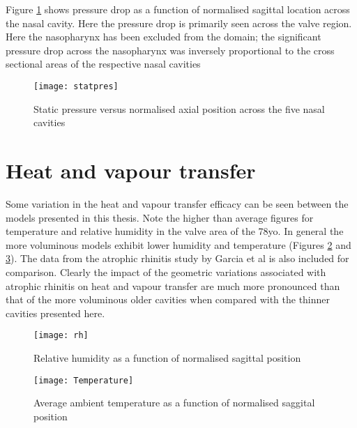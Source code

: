 Figure \ref{fig:stpr} shows pressure drop as a function of normalised sagittal location across the nasal cavity. Here the pressure drop is primarily seen across the valve region. Here the nasopharynx has been excluded from the domain; the significant pressure drop across the nasopharynx was inversely proportional to the cross sectional areas of the respective nasal cavities


\begin{figure} 
  \texttt{[image: statpres]}
  \caption{Static pressure versus normalised axial position across the five nasal cavities}
  \label{fig:stpr}
\end{figure}



\section{Heat and vapour transfer}

Some variation in the heat and vapour transfer efficacy can be seen between the models presented in this thesis. Note the higher than average figures for temperature and relative humidity in the valve area of the 78yo. In general the more voluminous models exhibit lower humidity and temperature (Figures \ref{fig:h2o} and \ref{fig:Temp}). The data from the atrophic rhinitis study by Garcia et al \cite{Garcia2007} is also included for comparison. Clearly the impact of the geometric variations associated with atrophic rhinitis on heat and vapour transfer are much more pronounced than that of the more voluminous older cavities when compared with the thinner cavities presented here. 

\begin{figure} 
  \texttt{[image: rh]}
  \caption{Relative humidity as a function of normalised sagittal position}
  \label{fig:h2o}
\end{figure}


\begin{figure} 
  \texttt{[image: Temperature]}
  \caption{Average ambient temperature as a function of normalised saggital position}
  \label{fig:Temp}
\end{figure}
